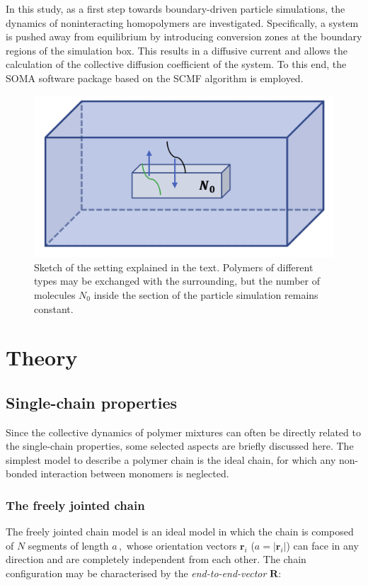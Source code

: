 \documentclass[bachelor,       %
               twoside,        %
               BCOR10mm,       %
               ngerman, english %
               ]{GAUBM}
\begin{document}
In this study, as a first step towards boundary-driven particle simulations, the dynamics of noninteracting homopolymers are investigated. Specifically, a system is pushed away from equilibrium by introducing conversion zones at the boundary regions of the simulation box. This results in a diffusive current and allows the calculation of the collective diffusion coefficient of the system. To this end, the \ac{SOMA} \cite{Schneider_soma} software package based on the \ac{SCMF} algorithm \cite{Daoulas06} is employed.
\begin{figure}[h]
  \centering
  \includegraphics[width=0.6\linewidth]{figures/continuum_section.png}
  \caption{Sketch of the setting explained in the text. Polymers of different types may be exchanged with the surrounding, but the number of molecules $N_0$ inside the section of the particle simulation remains constant.}
  \label{fig:continuum_section}
\end{figure}



\chapter{Theory}

\section{Single-chain properties}

Since the collective dynamics of polymer mixtures can often be directly related to the single-chain properties, some selected aspects are briefly discussed here. The simplest model to describe a polymer chain is the ideal chain, for which any non-bonded interaction between monomers is neglected.
\subsection{The freely jointed chain}

The freely jointed chain model is an ideal model in which the chain is composed of $N$ segments of length $a\,,$ whose orientation vectors $\mathbf r_i$ ($a=|\mathbf r_i|$) can face in any direction and are completely independent from each other. The chain configuration may be characterised by the \textit{end-to-end-vector} $\mathbf R$:
\end{document}
